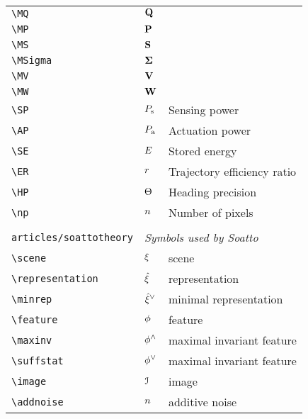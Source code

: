 \begin{longtable}{lll}
 {\color[rgb]{0.5,0.5,0.5}\texttt{\textbackslash MQ}} & $\mathbf{Q}$ & \\ 
 {\color[rgb]{0.5,0.5,0.5}\texttt{\textbackslash MP}} & $\mathbf{P}$ & \\ 
 {\color[rgb]{0.5,0.5,0.5}\texttt{\textbackslash MS}} & $\mathbf{S}$ & \\ 
 {\color[rgb]{0.5,0.5,0.5}\texttt{\textbackslash MSigma}} & $\mathbf{\Sigma}$ & \\ 
 {\color[rgb]{0.5,0.5,0.5}\texttt{\textbackslash MV}} & $\mathbf{V}$ & \\ 
 {\color[rgb]{0.5,0.5,0.5}\texttt{\textbackslash MW}} & $\mathbf{W}$ & \\ 
 {\color[rgb]{0.5,0.5,0.5}\texttt{\textbackslash SP}} & $P_{\text{s}}$ &  Sensing power\\ 
 {\color[rgb]{0.5,0.5,0.5}\texttt{\textbackslash AP}} & $P_{\text{a}}$ &  Actuation power\\ 
 {\color[rgb]{0.5,0.5,0.5}\texttt{\textbackslash SE}} & $E$ &  Stored energy\\ 
 {\color[rgb]{0.5,0.5,0.5}\texttt{\textbackslash ER}} & $r$ &  Trajectory efficiency ratio\\ 
 {\color[rgb]{0.5,0.5,0.5}\texttt{\textbackslash HP}} & $\Theta$ &  Heading precision\\ 
 {\color[rgb]{0.5,0.5,0.5}\texttt{\textbackslash np}} & $n$ &  Number of pixels\\ 
  &  & \\ 
 {\color[rgb]{0.5,0.5,0.5}\texttt{articles/soattotheory}} & \multicolumn{2}{l}{\emph{Symbols used by Soatto}}\\ 
 \hline
{\color[rgb]{0.5,0.5,0.5}\texttt{\textbackslash scene}} & $\xi$ &  scene\\ 
 {\color[rgb]{0.5,0.5,0.5}\texttt{\textbackslash representation}} & $\hat{\xi}$ &  representation\\ 
 {\color[rgb]{0.5,0.5,0.5}\texttt{\textbackslash minrep}} & ${\hat{\xi}}^{\vee}$ &  minimal representation\\ 
 {\color[rgb]{0.5,0.5,0.5}\texttt{\textbackslash feature}} & $\phi$ &  feature\\ 
 {\color[rgb]{0.5,0.5,0.5}\texttt{\textbackslash maxinv}} & $\phi^{\wedge}$ &  maximal invariant feature\\ 
 {\color[rgb]{0.5,0.5,0.5}\texttt{\textbackslash suffstat}} & $\phi^{\vee}$ &  maximal invariant feature\\ 
 {\color[rgb]{0.5,0.5,0.5}\texttt{\textbackslash image}} & $\mathcal{I}$ &  image\\ 
 {\color[rgb]{0.5,0.5,0.5}\texttt{\textbackslash addnoise}} & $n$ &  additive noise\\ 

\end{longtable}

